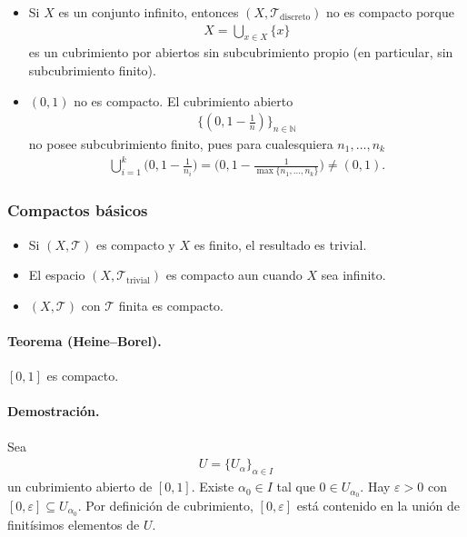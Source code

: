 \begin{itemize}
  \item[b)] Si $X$ es un conjunto infinito, entonces $(X,\mathcal T_{\text{discreto}})$ no es compacto porque
    \begin{align*}
    X=\bigcup_{x\in X}\{x\}
    \end{align*}
    es un cubrimiento por abiertos sin subcubrimiento propio (en particular, sin subcubrimiento finito).
  \item[c)] $(0,1)$ no es compacto.  
    El cubrimiento abierto
    \begin{align*}
      \bigl\{(0,1-\tfrac1n)\bigr\}_{n\in\mathbb N}
    \end{align*}
    no posee subcubrimiento finito, pues para cualesquiera $n_1,\dots,n_k$
    \begin{align*}
      \bigcup_{i=1}^{k}\!\bigl(0,1-\tfrac1{n_i}\bigr)=
      \bigl(0,1-\tfrac1{\max\{n_1,\dots,n_k\}}\bigr)\neq(0,1).
    \end{align*}
\end{itemize}

\subsubsection{Compactos básicos}

\begin{itemize}
  \item[a)] Si $(X,\mathcal T)$ es compacto y $X$ es finito, el resultado es trivial.
  \item[b)] El espacio $(X,\mathcal T_{\text{trivial}})$ es compacto aun cuando $X$ sea infinito.
  \item $(X,\mathcal T)$ con $\mathcal T$ finita es compacto.
\end{itemize}

\paragraph{\textbf{Teorema (Heine–Borel).}}
$[0,1]$ es compacto.

\paragraph{\textbf{Demostración.}}
Sea 
\begin{align*}
U=\{U_\alpha\}_{\alpha\in I}
\end{align*}
un cubrimiento abierto de $[0,1]$.  
Existe $\alpha_0\in I$ tal que $0\in U_{\alpha_0}$.  
Hay $\varepsilon>0$ con $[0,\varepsilon]\subseteq U_{\alpha_0}$.  
Por definición de cubrimiento, $[0,\varepsilon]$ está contenido en la unión de finitísimos elementos de $U$.

